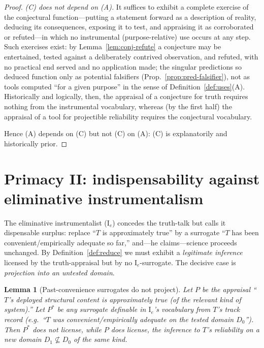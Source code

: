 \documentclass{amsart}
\theoremstyle{definition}
\theoremstyle{plain}
\newtheorem{lemma}{Lemma}
\begin{document}
\begin{proof}
\emph{(C) does not depend on (A).} It suffices to exhibit a complete exercise of
the conjectural function---putting a statement forward as a description of
reality, deducing its consequences, exposing it to test, and appraising it as
corroborated or refuted---in which no instrumental (purpose-relative) use occurs
at any step. Such exercises exist: by Lemma~\ref{lem:conj-refute} a conjecture
may be entertained, tested against a deliberately contrived observation, and
refuted, with no practical end served and no application made; the singular
predictions so deduced function only as potential falsifiers
(Prop.~\ref{prop:pred-falsifier}), not as tools computed ``for a given
purpose'' in the sense of Definition~\ref{def:uses}(A). Historically and
logically, then, the appraisal of a conjecture for truth requires nothing from
the instrumental vocabulary, whereas (by the first half) the appraisal of a tool
for projectible reliability requires the conjectural vocabulary.

Hence (A) depends on (C) but not (C) on (A): (C) is explanatorily and
historically prior.
\end{proof}

\section{Primacy II: indispensability against eliminative instrumentalism}\label{sec:indisp}

The eliminative instrumentalist ($\mathrm I_e$) concedes the truth-talk but
calls it dispensable surplus: replace ``$T$ is approximately true'' by a
surrogate ``$T$ has been convenient/empirically adequate so far,'' and---he
claims---science proceeds unchanged. By Definition~\ref{def:reduce} we must
exhibit a \emph{legitimate inference} licensed by the truth-appraisal but by no
$\mathrm I_e$-surrogate. The decisive case is \emph{projection into an untested
domain}.

\begin{lemma}[Past-convenience surrogates do not project]\label{lem:noproject}
Let $P$ be the appraisal ``$T$'s deployed structural content is approximately
true (of the relevant kind of system).'' Let $P^{*}$ be any surrogate definable
in $\mathrm I_e$'s vocabulary from $T$'s track record (e.g.\ ``$T$ was
convenient/empirically adequate on the tested domain $D_0$''). Then $P^{*}$ does
not license, while $P$ does license, the inference to $T$'s reliability on a
\emph{new} domain $D_1\not\subseteq D_0$ of the same kind.
\end{lemma}
\end{document}

